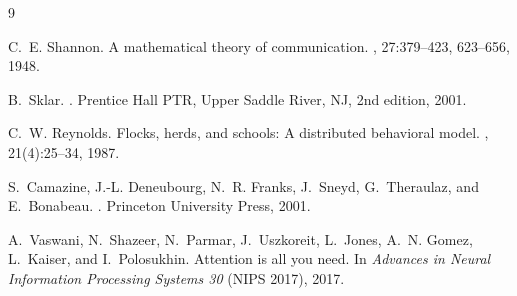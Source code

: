\documentclass[12pt,a4paper]{article}
\begin{document}
\begin{thebibliography}{9}

C.~E. Shannon.
\newblock A mathematical theory of communication.
, 27:379--423, 623--656, 1948.

B.~Sklar.
.
\newblock Prentice Hall PTR, Upper Saddle River, NJ, 2nd edition, 2001.

C.~W. Reynolds.
\newblock Flocks, herds, and schools: A distributed behavioral model.
, 21(4):25--34, 1987.

S.~Camazine, J.-L. Deneubourg, N.~R. Franks, J.~Sneyd, G.~Theraulaz, and E.~Bonabeau.
.
\newblock Princeton University Press, 2001.

A.~Vaswani, N.~Shazeer, N.~Parmar, J.~Uszkoreit, L.~Jones, A.~N. Gomez, L.~Kaiser, and I.~Polosukhin.
\newblock Attention is all you need.
\newblock In {\em Advances in Neural Information Processing Systems 30} (NIPS 2017), 2017.

\end{thebibliography}
\end{document}
